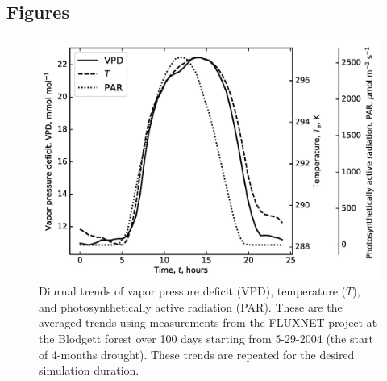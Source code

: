 \documentclass[utf8]{frontiersSCNS} %
\begin{document}







\clearpage

\subsection{Figures}

\begin{figure}[h]
    \begin{center}
         \includegraphics[scale=0.75]{environment.jpg} 
    \end{center}
    \caption{Diurnal trends of vapor pressure deficit (VPD), temperature ($T$), and photosynthetically active radiation (PAR). These are the averaged trends using measurements from the FLUXNET project at the Blodgett forest over 100 days starting from 5-29-2004 (the start of 4-months drought). These trends are repeated for the desired simulation duration.}
    \label{fig:environment}
\end{figure}
\end{document}
